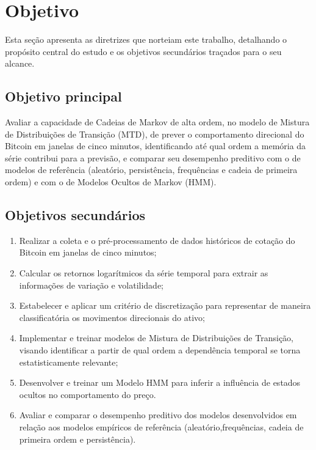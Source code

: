 \documentclass[
    12pt,                %
    openright,           %
    oneside,             %
    a4paper,             %
    english,             %
    brazil               %
]{abntex2}
\begin{document}
\section{Objetivo}
\label{sec:objetivo}
Esta seção apresenta as diretrizes que norteiam este trabalho, detalhando o propósito central do estudo e os objetivos secundários traçados para o seu alcance.

\subsection{Objetivo principal}

Avaliar a capacidade de Cadeias de Markov de alta ordem, no modelo de Mistura de Distribuições de Transição (MTD), 
de prever o comportamento direcional do Bitcoin em janelas de cinco minutos, identificando até qual ordem a memória 
da série contribui para a previsão, e comparar seu desempenho preditivo com o de modelos de referência 
(aleatório, persistência, frequências e cadeia de primeira ordem) e com o de Modelos Ocultos de Markov (HMM).

\subsection{Objetivos secundários}

\begin{enumerate}
    \item Realizar a coleta e o pré-processamento de dados históricos de cotação do Bitcoin em janelas de cinco minutos;
    \item Calcular os retornos logarítmicos da série temporal para extrair as informações de variação e volatilidade;
    \item Estabelecer e aplicar um critério de discretização para representar de maneira classificatória os movimentos direcionais do ativo;
    \item Implementar e treinar modelos de Mistura de Distribuições de Transição, visando identificar a partir de qual 
    ordem a dependência temporal se torna estatisticamente relevante;
    \item Desenvolver e treinar um Modelo HMM para inferir a influência de estados ocultos no comportamento do preço.
    \item Avaliar e comparar o desempenho preditivo dos modelos desenvolvidos em relação aos modelos empíricos de referência (aleatório,frequências, cadeia de primeira ordem e persistência).
\end{enumerate}
\end{document}
